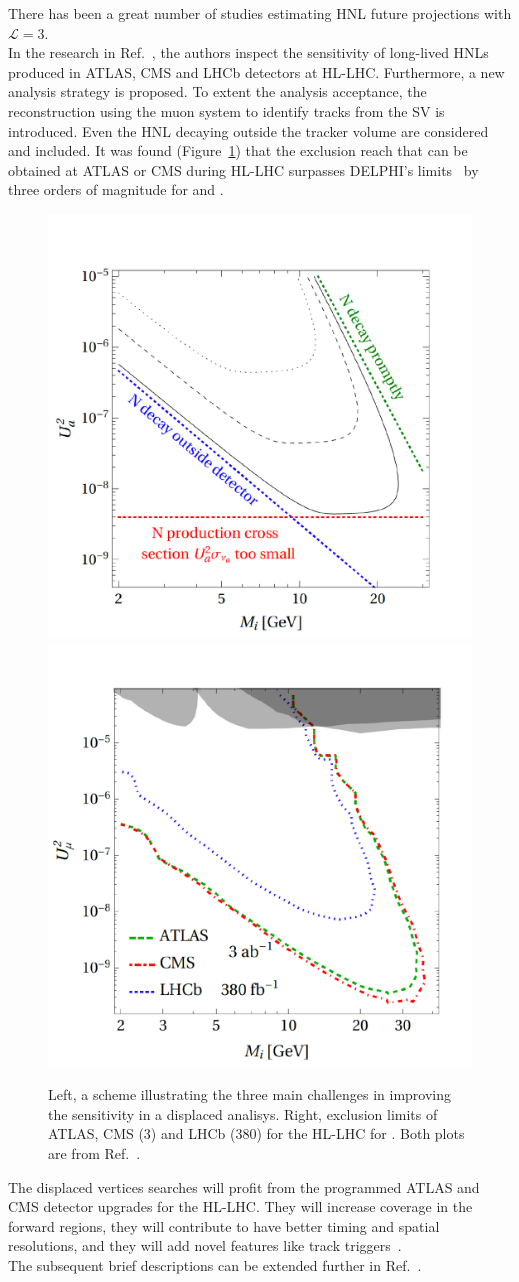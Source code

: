 There has been a great number of studies estimating HNL future
projections with $\mathcal{L} = 3$\abinv.\\
In the research in Ref.~\cite{Drewes_2020_jan}, the authors inspect the
sensitivity of long-lived HNLs produced in ATLAS, CMS and LHCb
detectors at HL-LHC. Furthermore, a new analysis strategy is proposed. To extent
the analysis acceptance, the reconstruction using the muon system to identify tracks from the
SV is introduced. Even the HNL decaying outside the tracker
volume are considered and included. It was found
(Figure~\ref{fig:marco_sketch_ll}) that the exclusion
reach that can be obtained at ATLAS or CMS during HL-LHC surpasses
DELPHI's limits~\cite{Abreu:1996pa} by three orders of magnitude for
\mixparm and \mixpare.\\

\begin{figure}[h!]
\centering
    \includegraphics[clip,trim=0.cm 0cm 0cm 2cm, width=.38\textwidth]{Figures/c7/marco_god.pdf}
    \includegraphics[clip,trim=0.cm 0cm 0cm 2cm, width=.37\textwidth]{Figures/c7/marco_mu_HL.pdf}
\caption{Left, a scheme illustrating the three main challenges in
  improving the sensitivity in a displaced analisys. Right, exclusion
  limits of ATLAS, CMS (3\abinv) and LHCb (380\fbinv)
 for the HL-LHC for \mixparm. Both plots are
  from Ref.~\cite{Drewes_2020_jan}. }
\label{fig:marco_sketch_ll}
\end{figure}


The displaced vertices
searches will profit from the programmed ATLAS and CMS detector
upgrades for the HL-LHC. 
They will increase coverage in the forward regions, they
will contribute to have better timing and spatial resolutions, and
they will add novel features like track
triggers~\cite{Alimena_2020}.\\
The subsequent brief descriptions can be extended further
in
Ref.~\cite{CERN-LHCC-2017-009,CERN-LHCC-2017-011,CERN-LHCC-2017-012,CERN-LHCC-2017-027,CERN-LHCC-2017-013}.


